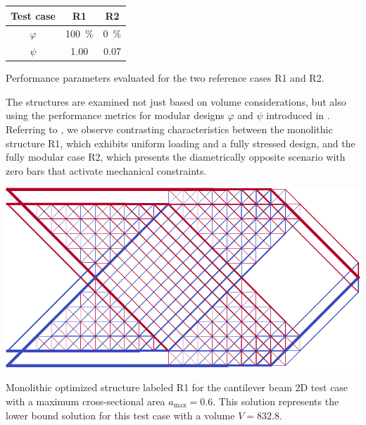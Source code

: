 \begin{margintable}
    \small
    \centering
    \begin{tabular}{ccc}
    \toprule
    \textbf{Test case} & \textbf{R1} & \textbf{R2}\\ \midrule
    $\varphi$ &\qty{100}{\percent}&\qty{0}{\percent}\\
    $\psi$  & 1.00&0.07   \\
    \bottomrule
    \end{tabular}
    \caption{Performance parameters evaluated for the two reference cases R1 and R2.}
    \label{tab:06_modular_cant_perf}    
\end{margintable}

The structures are examined not just based on volume considerations, but also using the performance metrics for modular designs $\varphi$ and $\psi$ introduced in . Referring to , we observe contrasting characteristics between the monolithic structure R1, which exhibits uniform loading and a fully stressed design, and the fully modular case R2, which presents the diametrically opposite scenario with zero bars that activate mechanical constraints.

\begin{marginfigure}
    \centering
    \includegraphics[width=\linewidth]{figures/06_DMO/00_cantilever_extremes/mono.pdf}
    \caption{Monolithic optimized structure labeled R1 for the cantilever beam 2D test case with a maximum cross-sectional area $a_\text{max}=0.6$. This solution represents the lower bound solution for this test case with a volume $V=832.8$.}
    \label{fig:06_cant_mono}
\end{marginfigure}


